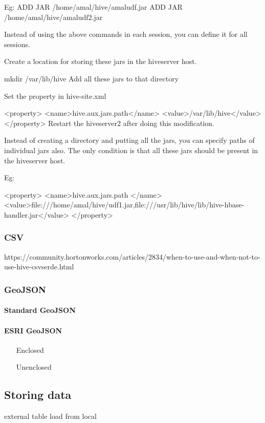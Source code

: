 \documentclass[a4paper,12pt,oneside]{report}
\begin{document}
Eg: ADD JAR /home/amal/hive/amaludf.jar ADD JAR /home/amal/hive/amaludf2.jar

Instead of using the above commands in each session, you can define it for all sessions.

Create a location for storing these jars in the hiveserver host.

mkdir /var/lib/hive
Add all these jars to that directory

Set the property in hive-site.xml

<property>
  <name>hive.aux.jars.path</name>
  <value>/var/lib/hive</value>
</property>
Restart the hiveserver2 after doing this modification.

Instead of creating a directory and putting all the jars, you can specify paths of individual jars also. The only condition is that all these jars should be present in the hiveserver host.

Eg:

<property>
  <name>hive.aux.jars.path </name>
  <value>file:///home/amal/hive/udf1.jar,file:///usr/lib/hive/lib/hive-hbase-handler.jar</value>
</property>
	
		\subsubsection{CSV}
		
		https://community.hortonworks.com/articles/2834/when-to-use-and-when-not-to-use-hive-csvserde.html
		\subsubsection{GeoJSON}\label{json}	
			\paragraph{Standard GeoJSON}	
			\paragraph{ESRI GeoJSON}
				\begin{enumerate}
					\item[Enclosed]
					\item[Unenclosed]
				\end{enumerate}
	
	
	\subsection{Storing data}
	external table
	load from local
\end{document}
